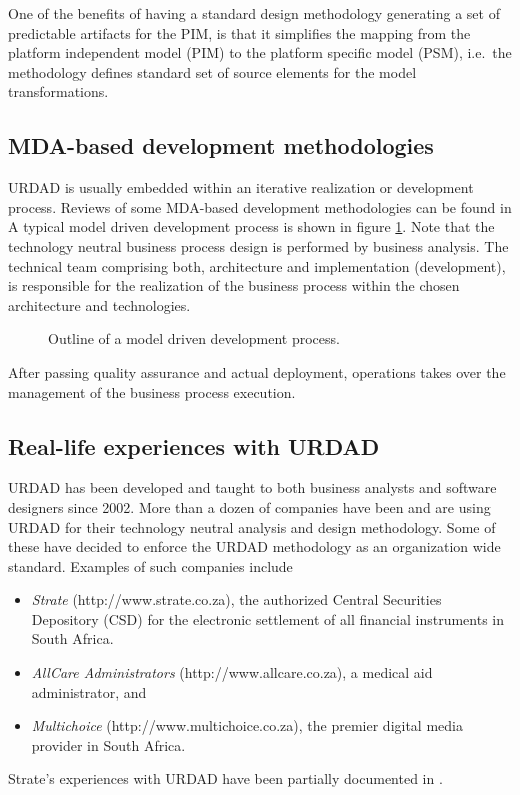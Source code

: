 \documentclass[reviewcopy]{elsart}
\begin{document}
One of the benefits of having a standard design methodology generating a set of
predictable artifacts for the PIM, is that it simplifies the mapping from the platform
independent model (PIM) to the platform specific model (PSM), i.e.\ the methodology defines
standard set of source elements for the model transformations.


\subsection{MDA-based development methodologies}

URDAD is usually embedded within an iterative realization or development process. Reviews of some
MDA-based development methodologies can be found in \cite{bercovici:businessArchitectureToSoa}
A typical model driven development process is shown in figure \ref{fig:developmentProcess}. 
Note that the technology neutral business process design is performed by business analysis. 
The technical team comprising both, architecture and implementation (development), 
is responsible for the realization of the business process within the chosen architecture and technologies.

\begin{figure}
  \centering
  \caption{Outline of a model driven development process.}
  \label{fig:developmentProcess}
\end{figure}

After passing quality assurance and actual deployment, operations takes over the management of the
business process execution.


\subsection{Real-life experiences with URDAD}

URDAD has been developed and taught to both business analysts and software designers since 2002.
More than a dozen of companies have been and are using URDAD for their technology neutral analysis
and design methodology. Some of these have decided to enforce the URDAD methodology as an organization
wide standard. Examples of such companies include
\begin{itemize}
  \item {\em Strate} (http://www.strate.co.za), the authorized Central Securities Depository (CSD) for the electronic settlement of all financial instruments in South Africa.
	\item {\em AllCare Administrators} (http://www.allcare.co.za), a medical aid administrator, and
	\item {\em Multichoice} (http://www.multichoice.co.za), the premier digital media provider in South Africa.
\end{itemize}
Strate's experiences with URDAD have been partially documented in \cite{klopper:compareSoftwareMethodologies}.
\end{document}
